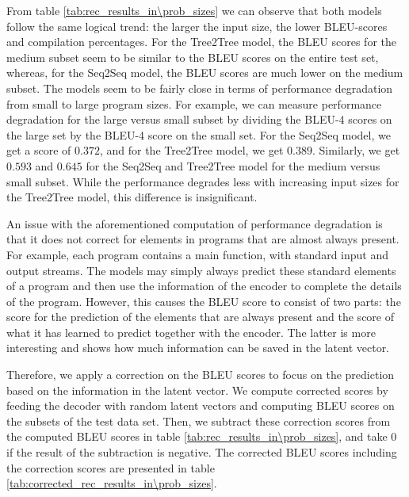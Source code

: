 From table \ref{tab:rec_results_in\prob_sizes} we can observe that both models follow the same logical trend: the larger the input size, the lower BLEU-scores and compilation percentages. For the Tree2Tree model, the BLEU scores for the medium subset seem to be similar to the BLEU scores on the entire test set, whereas, for the Seq2Seq model, the BLEU scores are much lower on the medium subset. The models seem to be fairly close in terms of performance degradation from small to large program sizes. For example, we can measure performance degradation for the large versus small subset by dividing the BLEU-4 scores on the large set by the BLEU-4 score on the small set. For the Seq2Seq model, we get a score of $0.372$, and for the Tree2Tree model, we get $0.389$. Similarly, we get $0.593$ and $0.645$ for the Seq2Seq and Tree2Tree model for the medium versus small subset. While the performance degrades less with increasing input sizes for the Tree2Tree model, this difference is insignificant. 



An issue with the aforementioned computation of performance degradation is that it does not correct for elements in programs that are almost always present. For example, each program contains a main function, with standard input and output streams. The models may simply always predict these standard elements of a program and then use the information of the encoder to complete the details of the program. However, this causes the BLEU score to consist of two parts: the score for the prediction of the elements that are always present and the score of what it has learned to predict together with the encoder. The latter is more interesting and shows how much information can be saved in the latent vector. 



Therefore, we apply a correction on the BLEU scores to focus on the prediction based on the information in the latent vector. We compute corrected scores by feeding the decoder with random latent vectors and computing BLEU scores on the subsets of the test data set. Then, we subtract these correction scores from the computed BLEU scores in table \ref{tab:rec_results_in\prob_sizes}, and take 0 if the result of the subtraction is negative. The corrected BLEU scores including the correction scores are presented in table \ref{tab:corrected_rec_results_in\prob_sizes}.

